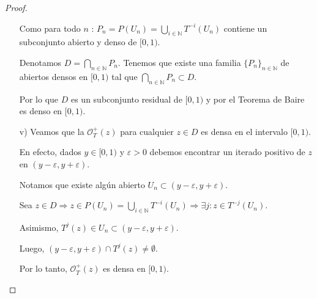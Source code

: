 \documentclass[12pt]{report}
\begin{document}
\begin{proof}
\begin{itemize}
    Como para todo $n$ :  $P_{n}=P(U_{n})=\displaystyle\bigcup_{i\in\mathbb{N}}T^{-i}(U_{n})$ contiene un subconjunto abierto y denso de $[0,1)$.
    
    Denotamos $D=\displaystyle\bigcap_{n\in\mathbb{N}} P_{n}$.
    Tenemos que existe una familia $\{P_{n}\}_{n\in\mathbb{N}}$ de abiertos densos en $[0,1)$ tal que $\displaystyle\bigcap_{n\in\mathbb{N}} P_{n}\subset D$.
    
    Por lo que $D$ es un subconjunto residual de $[0,1)$ y por el Teorema de Baire es denso en $[0,1)$.
    \item[v)] Veamos que la $\mathcal{O}_{T}^{+}(z)$ para cualquier $z\in D$ es densa en el intervalo $[0,1)$.
    
    En efecto, dados $y\in[0,1)$ y $\varepsilon>0$ debemos encontrar un iterado positivo de $z$ en $(y-\varepsilon,y+\varepsilon)$.
    
    Notamos que existe algún abierto $U_{n}\subset(y-\varepsilon,y+\varepsilon)$.
    
    Sea $z\in D\Rightarrow z\in P(U_{n})=\displaystyle\bigcup_{i\in\mathbb{N}} T^{-i}(U_{n})\Rightarrow \exists j : z\in T^{-j}(U_{n})$.
    
    Asimismo, $T^{j}(z)\in U_{n}\subset(y-\varepsilon,y+\varepsilon)$.
    
    Luego, $(y-\varepsilon,y+\varepsilon)\cap T^{j}(z)\neq\emptyset$.
    
    Por lo tanto, $\mathcal{O}_{T}^{+}(z)$ es densa en $[0,1)$.
\end{itemize}
\end{proof}



\newpage


\renewcommand*{\bibname}{BIBLIOGRAFÍA}

\end{document}
